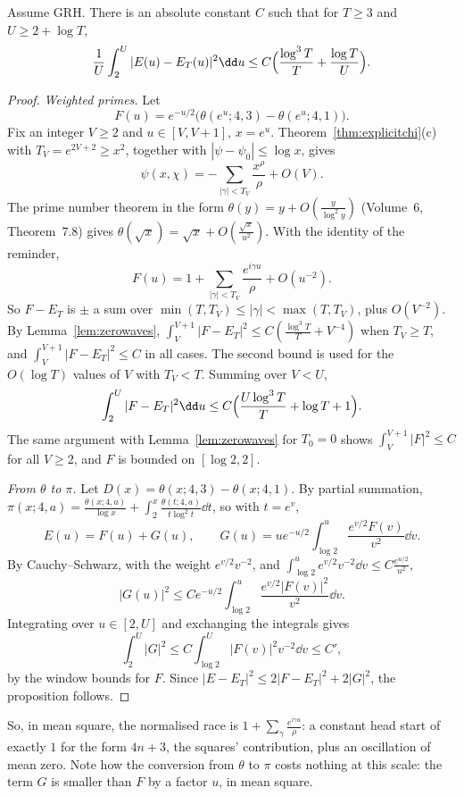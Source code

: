\begin{proposition}\label{prop:racel2}
Assume GRH. There is an absolute constant $C$ such that for $T\ge3$ and $U\ge2+\log T$,
\[
\frac1U\int_2^U|E(u)-E_T(u)|^2\dd u\le C\Bigl(\frac{\log^3T}T+\frac{\log T}U\Bigr).
\]
\end{proposition}
\begin{proof}
\emph{Weighted primes.} Let
\[
F(u)=e^{-u/2}\bigl(\theta(e^u;4,3)-\theta(e^u;4,1)\bigr).
\]
Fix an integer $V\ge2$ and $u\in[V,V+1]$, $x=e^u$. Theorem~\ref{thm:explicitchi}(c) with $T_V=e^{2V+2}\ge x^2$, together with $|\psi-\psi_0|\le\log x$, gives
\[
\psi(x,\chi)=-\sum_{|\gamma|<T_V}\frac{x^\rho}\rho+O(V).
\] The prime number theorem in the form $\theta(y)=y+O(\frac y{\log^2y})$ (Volume~6, Theorem~7.8) gives $\theta(\sqrt x)=\sqrt x+O(\frac{\sqrt x}{u^2})$. With the identity of the reminder,
\[
F(u)=1+\sum_{|\gamma|<T_V}\frac{e^{i\gamma u}}\rho+O(u^{-2}).
\]
So $F-E_T$ is $\pm$ a sum over $\min(T,T_V)\le|\gamma|<\max(T,T_V)$, plus $O(V^{-2})$. By Lemma~\ref{lem:zerowaves}, $\int_V^{V+1}|F-E_T|^2\le C(\frac{\log^3T}T+V^{-4})$ when $T_V\ge T$, and $\int_V^{V+1}|F-E_T|^2\le C$ in all cases. The second bound is used for the $O(\log T)$ values of $V$ with $T_V<T$. Summing over $V<U$,
\[
\int_2^U|F-E_T|^2\dd u\le C\Bigl(\frac{U\log^3T}T+\log T+1\Bigr).
\]
The same argument with Lemma~\ref{lem:zerowaves} for $T_0=0$ shows $\int_V^{V+1}|F|^2\le C$ for all $V\ge2$, and $F$ is bounded on $[\log2,2]$.

\emph{From $\theta$ to $\pi$.} Let $D(x)=\theta(x;4,3)-\theta(x;4,1)$. By partial summation, $\pi(x;4,a)=\frac{\theta(x;4,a)}{\log x}+\int_2^x\frac{\theta(t;4,a)}{t\log^2t}\dd t$, so with $t=e^v$,
\[
E(u)=F(u)+G(u),\qquad G(u)=ue^{-u/2}\int_{\log2}^u\frac{e^{v/2}F(v)}{v^2}\dd v.
\]
By Cauchy--Schwarz, with the weight $e^{v/2}v^{-2}$, and $\int_{\log2}^ue^{v/2}v^{-2}\dd v\le C\frac{e^{u/2}}{u^2}$,
\[
|G(u)|^2\le C e^{-u/2}\int_{\log2}^u\frac{e^{v/2}|F(v)|^2}{v^2}\dd v.
\]
Integrating over $u\in[2,U]$ and exchanging the integrals gives
\[
\int_2^U|G|^2\le C\int_{\log2}^U|F(v)|^2v^{-2}\dd v\le C',
\]
by the window bounds for $F$. Since $|E-E_T|^2\le2|F-E_T|^2+2|G|^2$, the proposition follows.
\end{proof}

So, in mean square, the normalised race is $1+\sum_\gamma\frac{e^{i\gamma u}}\rho$: a constant head start of exactly $1$ for the form $4n+3$, the squares' contribution, plus an oscillation of mean zero. Note how the conversion from $\theta$ to $\pi$ costs nothing at this scale: the term $G$ is smaller than $F$ by a factor $u$, in mean square.

